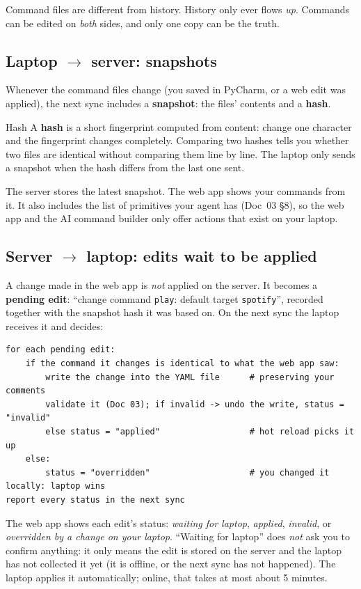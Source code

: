 \documentclass[11pt,a4paper]{article}
\begin{document}
Command files are different from history. History only ever flows \emph{up}. Commands can be
edited on \emph{both} sides, and only one copy can be the truth.

\subsection{Laptop $\to$ server: snapshots}
Whenever the command files change (you saved in PyCharm, or a web edit was applied), the next
sync includes a \textbf{snapshot}: the files' contents and a \textbf{hash}.

\begin{concept}{Hash}
A \textbf{hash} is a short fingerprint computed from content: change one character and the
fingerprint changes completely. Comparing two hashes tells you whether two files are identical
without comparing them line by line. The laptop only sends a snapshot when the hash differs from
the last one sent.
\end{concept}

\noindent The server stores the latest snapshot. The web app shows your commands from it.
It also includes the list of primitives your agent has (Doc~03 \S8), so the web app and the AI
command builder only offer actions that exist on your laptop.

\subsection{Server $\to$ laptop: edits wait to be applied}
A change made in the web app is \emph{not} applied on the server. It becomes a \textbf{pending
edit}: ``change command \texttt{play}: default target \texttt{spotify}'', recorded together with
the snapshot hash it was based on. On the next sync the laptop receives it and decides:

\begin{lstlisting}
for each pending edit:
    if the command it changes is identical to what the web app saw:
        write the change into the YAML file      # preserving your comments
        validate it (Doc 03); if invalid -> undo the write, status = "invalid"
        else status = "applied"                  # hot reload picks it up
    else:
        status = "overridden"                    # you changed it locally: laptop wins
report every status in the next sync
\end{lstlisting}

\noindent The web app shows each edit's status: \emph{waiting for laptop}, \emph{applied},
\emph{invalid}, or \emph{overridden by a change on your laptop}. ``Waiting for laptop'' does
\emph{not} ask you to confirm anything: it only means the edit is stored on the server and the
laptop has not collected it yet (it is offline, or the next sync has not happened). The laptop
applies it automatically; online, that takes at most about 5 minutes.
\end{document}
